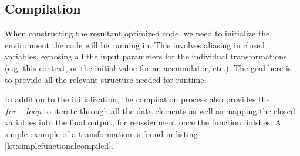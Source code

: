\subsection{Compilation}\label{Compilation}
When constructing the resultant optimized code, we need to initialize the environment the code will be running in.  This involves aliasing in closed variables, exposing all the input parameters for the individual transformations (e.g. this context, or the initial value for an accumulator, etc.).  The goal here is to provide all the relevant structure needed for runtime.  

In addition to the initialization, the compilation process also provides the $for-loop$ to iterate through all the data elements as well as mapping the closed variables into the final output, for reassignment once the function finishes.  A simple example of a transformation is found in listing \ref{lst:simplefunctionalcompiled}.

\begin{minipage}{\linewidth}

\end{minipage}